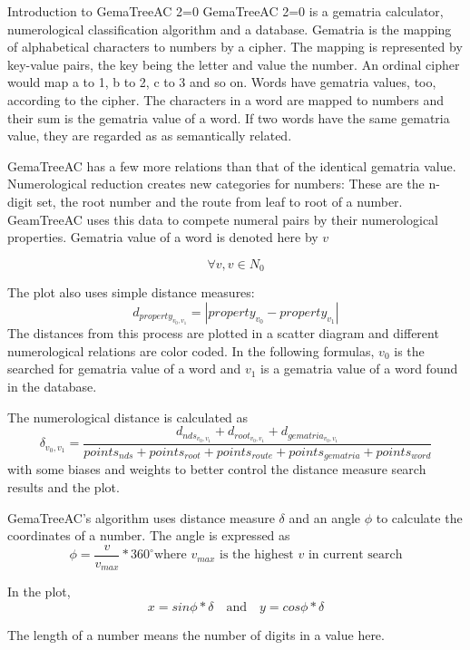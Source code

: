 \documentclass[a4paper,10pt]{article}
\begin{document}
   \begin{section}{Introduction to GemaTreeAC 2=0}
     GemaTreeAC 2=0 is a gematria calculator, numerological classification algorithm and a database.
     Gematria is the mapping of alphabetical characters to numbers by a cipher. The mapping is represented by
     key-value pairs, the key being the letter and value the number. An ordinal cipher would map a to 1, b to 2,
     c to 3 and so on. Words have gematria values, too, according to the cipher. The characters in a word are mapped to
     numbers and their sum is the gematria value of a word. If two words have the same gematria value,
     they are regarded as as semantically related.

     GemaTreeAC has a few more relations than that of the identical gematria value.
     Numerological reduction creates new categories for numbers:
     These are the n-digit set, the root number and the
     route from leaf to root of a number. GeamTreeAC uses this data
     to compete numeral pairs by their numerological properties.
     Gematria value of a word is denoted here by $v$
     
     \[
     \forall v, v \in N_0
     \]


     The plot also uses simple distance measures:
     \[d_{property_{v_0,v_1}} = |property_{v_0} - property_{v_1}|\] The distances from
     this process are plotted in a scatter diagram and
     different numerological relations are color coded. In the following formulas, $v_0$
     is the searched for gematria value of a word and $v_1$ is a gematria value of a word found in the database.

     The numerological distance is calculated as
     \[
     \delta_{v_0, v_1} = \frac{  d_{nds_{v_0,v_1}}+d_{root_{v_0,v_1}}+d_{gematria_{v_0,v_1}}  }
     {  points_{nds} + points_{root} + points_{route} + points_{gematria} + points_{word}  }
     \] with some biases and weights to better control the distance measure search results and the plot.

     GemaTreeAC's algorithm uses distance measure $\delta$ and an angle $\phi$ to calculate the coordinates of a number.
     The angle is expressed as
     \[
     \phi = \frac{v}{v_{max}}*360^\circ \textrm{where $v_{max}$ is the highest $v$ in current search} 
     \]

     In the plot,
     \[
     x = sin\phi*\delta \quad \textrm{and} \quad y = cos\phi*\delta
     \]

     The length of a number means the number of digits in a value here.


\end{section}
\end{document}
